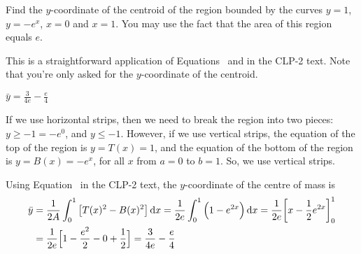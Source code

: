 
\begin{question}[2012A]
Find the $y$-coordinate of the centroid of the region bounded by the
curves $y=1$, $y=-e^x$, $x=0$ and $x=1$. You may use the fact that the area
of this region equals $e$.
\end{question}

\begin{hint}
This is a straightforward application of Equations~ and   in the
CLP-2 text. Note that you're only asked for the $y$-coordinate of the centroid.
\end{hint}

\begin{answer}
$\displaystyle\bar y = \frac{3}{4e}-\frac{e}{4}$
\end{answer}

\begin{solution}
If we use horizontal strips, then we need to break the region into two pieces: $y \geq -1=-e^0$, and $y \leq -1$. However, if we use vertical strips,
the equation of the top of the region is $y=T(x)=1$, and the equation of the
bottom of the region is $y=B(x)=-e^x$, for all $x$  from $a=0$ to $b=1$. So, we use vertical strips.

\begin{center}
\end{center}

Using Equation~ in the CLP-2 text, the $y$-coordinate of the centre of mass is
\begin{align*}
\bar y & = \frac{1}{2A}\int_0^1  \big[T(x)^2-B(x)^2\big]\,\mathrm{d}x
= \frac{1}{2e}\int_0^1 \Big(1-e^{2x} \Big) \,\mathrm{d}x
= \frac{1}{2e}\bigg[x-\frac{1}{2}e^{2x}\bigg]_0^1 \\
&= \frac{1}{2e}\Big[1-\frac{e^2}{2} -0 + \frac{1}{2}\Big]
=\frac{3}{4e}-\frac{e}{4}
\end{align*}

\end{solution}


